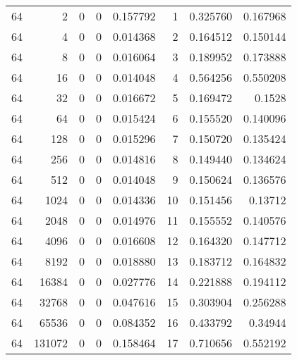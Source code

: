 \begin{longtable}[c]{@{}rrrrrrrr@{}}
    64        & 2         & 0         & 0        & 0.157792    & 1                   & 0.325760    & 0.167968   \\
    64        & 4         & 0         & 0        & 0.014368    & 2                   & 0.164512    & 0.150144   \\
    64        & 8         & 0         & 0        & 0.016064    & 3                   & 0.189952    & 0.173888   \\
    64        & 16        & 0         & 0        & 0.014048    & 4                   & 0.564256    & 0.550208   \\
    64        & 32        & 0         & 0        & 0.016672    & 5                   & 0.169472    & 0.1528     \\
    64        & 64        & 0         & 0        & 0.015424    & 6                   & 0.155520    & 0.140096   \\
    64        & 128       & 0         & 0        & 0.015296    & 7                   & 0.150720    & 0.135424   \\
    64        & 256       & 0         & 0        & 0.014816    & 8                   & 0.149440    & 0.134624   \\
    64        & 512       & 0         & 0        & 0.014048    & 9                   & 0.150624    & 0.136576   \\
    64        & 1024      & 0         & 0        & 0.014336    & 10                  & 0.151456    & 0.13712    \\
    64        & 2048      & 0         & 0        & 0.014976    & 11                  & 0.155552    & 0.140576   \\
    64        & 4096      & 0         & 0        & 0.016608    & 12                  & 0.164320    & 0.147712   \\
    64        & 8192      & 0         & 0        & 0.018880    & 13                  & 0.183712    & 0.164832   \\
    64        & 16384     & 0         & 0        & 0.027776    & 14                  & 0.221888    & 0.194112   \\
    64        & 32768     & 0         & 0        & 0.047616    & 15                  & 0.303904    & 0.256288   \\
    64        & 65536     & 0         & 0        & 0.084352    & 16                  & 0.433792    & 0.34944    \\
    64        & 131072    & 0         & 0        & 0.158464    & 17                  & 0.710656    & 0.552192   \\

\end{longtable}
